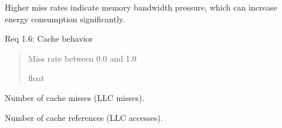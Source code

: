 \documentclass[letterpaper,10pt,english]{sphinxmanual}
\begin{document}
\begin{fulllineitems}
\begin{fulllineitems}
\sphinxAtStartPar
Higher miss rates indicate memory bandwidth pressure,
which can increase energy consumption significantly.

\sphinxAtStartPar
Req 1.6: Cache behavior
\begin{quote}\begin{description}
\sphinxAtStartPar
Miss rate between 0.0 and 1.0

\sphinxAtStartPar
float

\end{description}\end{quote}

\end{fulllineitems}


\begin{fulllineitems}
\label{\detokenize{core.models.energy_measurement:core.models.energy_measurement.PerformanceCounters.cache_misses}}
\pysigstartsignatures
\pysigline
{}
\pysigstopsignatures
\sphinxAtStartPar
Number of cache misses (LLC misses).

\end{fulllineitems}


\begin{fulllineitems}
\label{\detokenize{core.models.energy_measurement:core.models.energy_measurement.PerformanceCounters.cache_references}}
\pysigstartsignatures
\pysigline
{}
\pysigstopsignatures
\sphinxAtStartPar
Number of cache references (LLC accesses).

\end{fulllineitems}



\end{fulllineitems}
\end{document}
